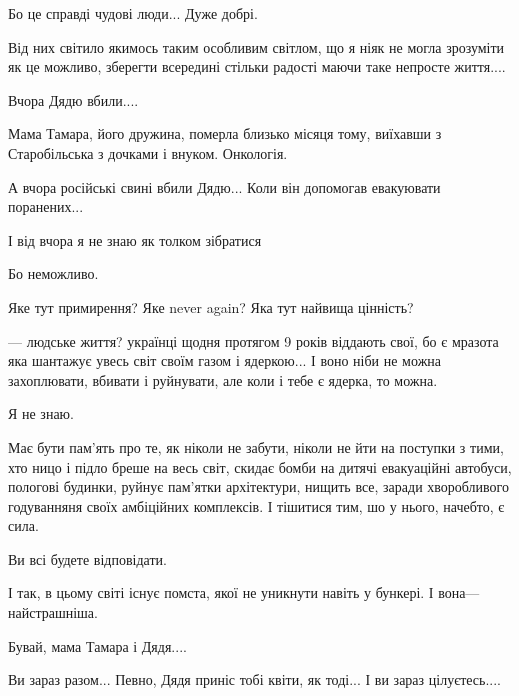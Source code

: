 Бо це справді чудові люди... Дуже добрі.

Від них світило якимось таким особливим світлом, що я ніяк не могла зрозуміти
як це можливо, зберегти всередині стільки радості маючи таке непросте життя....

Вчора Дядю вбили....

Мама Тамара, його дружина, померла близько місяця тому, виїхавши з
Старобільська з дочками і внуком. Онкологія.

А вчора російські свині вбили Дядю... Коли він допомогав евакуювати
поранених...

І від вчора я не знаю як толком зібратися

Бо неможливо.

Яке тут примирення? Яке never again? Яка тут найвища цінність? 

—  людське життя? українці щодня протягом 9 років віддають свої, бо є мразота
яка шантажує увесь світ своїм газом і ядеркою... І воно ніби не можна
захоплювати, вбивати і руйнувати, але коли і тебе є ядерка, то можна. 

Я не знаю.

Має бути пам'ять про те, як ніколи не забути, ніколи не йти на поступки з тими,
хто ницо і підло бреше на весь світ, скидає бомби на дитячі евакуаційні
автобуси, пологові будинки, руйнує пам'ятки архітектури, нищить все, заради
хворобливого годуванняня своїх амбіційних комплексів. І тішитися тим,  шо у
нього, начебто, є сила.

Ви всі будете відповідати.

І так, в цьому світі існує помста, якої не уникнути навіть у бункері. І вона—
найстрашніша.

Бувай, мама Тамара і Дядя....

Ви зараз разом... Певно, Дядя приніс тобі квіти, як тоді... І ви зараз
цілуєтесь....


